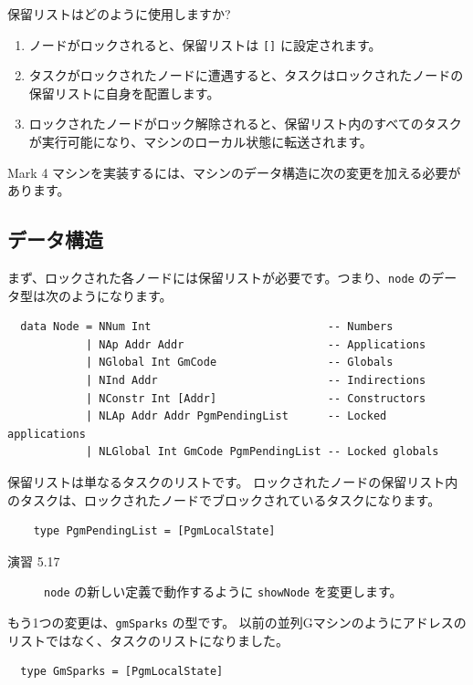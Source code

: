 \documentclass{jbook}
\begin{document}
保留リストはどのように使用しますか?

\begin{enumerate}
	\item ノードがロックされると、保留リストは \texttt{[]} に設定されます。
	\item タスクがロックされたノードに遭遇すると、タスクはロックされたノードの保留リストに自身を配置します。
	\item ロックされたノードがロック解除されると、保留リスト内のすべてのタスクが実行可能になり、マシンのローカル状態に転送されます。
\end{enumerate}

Mark 4 マシンを実装するには、マシンのデータ構造に次の変更を加える必要があります。

\subsection{データ構造}

まず、ロックされた各ノードには保留リストが必要です。つまり、\texttt{node} のデータ型は次のようになります。

\begin{verbatim}
  data Node = NNum Int                           -- Numbers
            | NAp Addr Addr                      -- Applications
            | NGlobal Int GmCode                 -- Globals
            | NInd Addr                          -- Indirections
            | NConstr Int [Addr]                 -- Constructors
            | NLAp Addr Addr PgmPendingList      -- Locked applications
            | NLGlobal Int GmCode PgmPendingList -- Locked globals
\end{verbatim}

保留リストは単なるタスクのリストです。
ロックされたノードの保留リスト内のタスクは、ロックされたノードでブロックされているタスクになります。

\begin{verbatim}
	type PgmPendingList = [PgmLocalState]
\end{verbatim}

\begin{description}
	\item[演習 5.17] \texttt{node} の新しい定義で動作するように \texttt{showNode} を変更します。
\end{description}

もう1つの変更は、\texttt{gmSparks} の型です。
以前の並列Gマシンのようにアドレスのリストではなく、タスクのリストになりました。

\begin{verbatim}
  type GmSparks = [PgmLocalState]
\end{verbatim}
\end{document}
